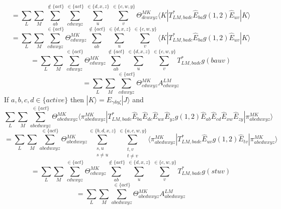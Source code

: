 \documentclass[12pt]{article}
\begin{document}
\begin{equation*}
=\sum_{L} \sum_{M} \sum_{ab}^{\notin \{act\} } \sum_{cdwxyz}^{\in\{act\}} \sum_{u}^{\in\{d,x,z\}}\sum_{v}^{\in\{c,w,y\}}
\Theta^{MK}_{dcwxyz} \langle K|T^{*}_{LM,badc}\hat{E}_{ba}g(1,2)\hat{E}_{uv} |K\rangle
\end{equation*}
\begin{equation*}
=\sum_{L} \sum_{M}\sum_{cdwxyz}^{\in\{act\}}\Theta^{MK}_{cdwxyz}   \sum_{ab}^{\notin \{act\} } \sum_{u}^{\in\{d,x,z\}}\sum_{v}^{\in\{c,w,y\}}
 \langle K |T^{*}_{LM,badc}\hat{E}_{ba}g(1,2)\hat{E}_{uv} |K\rangle
\end{equation*}
\begin{equation*}
=\sum_{L} \sum_{M}\sum_{cdwxyz}^{\in\{act\}}\Theta^{MK}_{cdwxyz}   \sum_{ab}^{\notin \{act\} } \sum_{u}^{\in\{d,x,z\}}\sum_{v}^{\in\{c,w,y\}}T^{*}_{LM,badc}g(bauv)
\end{equation*}
\begin{equation*}
=\sum_{L} \sum_{M}\sum_{cdwxyz}^{\in\{act\}}\Theta^{MK}_{cdwxyz}A^{LM}_{cdwxyz}
\end{equation*}
\noindent If $a,b,c,d \in \{active\} $  then $|K\rangle = E_{\gamma\delta\eta\zeta}|J\rangle$ and  
\begin{equation*}
\sum_{L} \sum_{M} \sum_{abcdwxyz}^{\in\{act\}} 
\Theta^{MK}_{abcdwxyz} \langle \pi^{MK}_{abcdwxyz}|T^{*}_{LM,badc}\hat{E}_{ba}\hat{E}_{dc}\hat{E}_{wx}\hat{E}_{yz}g(1,2)\hat{E}_{ab}\hat{E}_{cd}\hat{E}_{xw}\hat{E}_{zy} |\pi^{MK}_{abcdwxyz}  \rangle
\end{equation*}
\begin{equation*}
=\sum_{L} \sum_{M} \sum_{abcdwxyz}^{\in\{act\}} \Theta^{MK}_{abcdwxyz}\sum_{\substack{s,u\\ s\neq u}}^{\in\{b,d,x,z\}}\sum_{\substack{t,v\\ t\neq v}}^{\in\{a,c,w,y\}}
 \langle \pi^{MK}_{abcdwxyz}|T^{*}_{LM,badc}\hat{E}_{uv}g(1,2)\hat{E}_{tv} |\pi^{MK}_{abcdwxyz}  \rangle
\end{equation*}
\begin{equation*}
=\sum_{L} \sum_{M}\sum_{cdwxyz}^{\in\{act\}}\Theta^{MK}_{cdwxyz}   \sum_{ab}^{\notin \{act\} } \sum_{u}^{\in\{d,x,z\}}\sum_{v}^{\in\{c,w,y\}} T^{*}_{LM,badc}g(stuv)
\end{equation*}
\begin{equation*}
=\sum_{L} \sum_{M}\sum_{abcdwxyz}^{\in\{act\}}\Theta^{MK}_{abcdwxyz}A^{LM}_{abcdwxyz}
\end{equation*}
\end{document}
